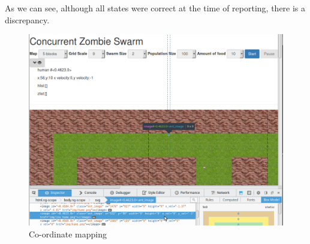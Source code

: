 As we can see, although all states were correct at the time of reporting, there is a discrepancy.
\begin{figure}[b]
  \centering
  \includegraphics[width=1\textwidth]{img/co-ordinates.png}
\caption{Co-ordinate mapping}
    \label{fig:co-ordinate mapping}
\end{figure}

\clearpage
\endinput

